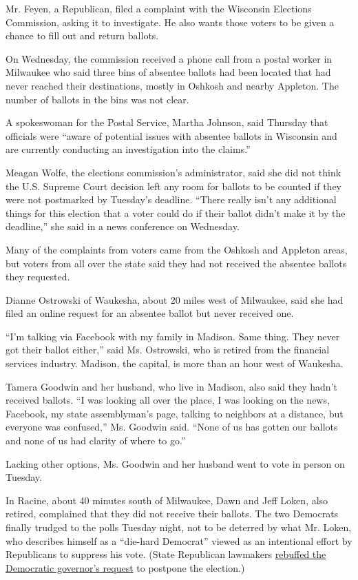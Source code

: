 Mr. Feyen, a Republican, filed a complaint with the Wisconsin Elections
Commission, asking it to investigate. He also wants those voters to be
given a chance to fill out and return ballots.

On Wednesday, the commission received a phone call from a postal worker
in Milwaukee who said three bins of absentee ballots had been located
that had never reached their destinations, mostly in Oshkosh and nearby
Appleton. The number of ballots in the bins was not clear.

A spokeswoman for the Postal Service, Martha Johnson, said Thursday that
officials were ``aware of potential issues with absentee ballots in
Wisconsin and are currently conducting an investigation into the
claims.''

Meagan Wolfe, the elections commission's administrator, said she did not
think the U.S. Supreme Court decision left any room for ballots to be
counted if they were not postmarked by Tuesday's deadline. ``There
really isn't any additional things for this election that a voter could
do if their ballot didn't make it by the deadline,'' she said in a news
conference on Wednesday.

Many of the complaints from voters came from the Oshkosh and Appleton
areas, but voters from all over the state said they had not received the
absentee ballots they requested.

Dianne Ostrowski of Waukesha, about 20 miles west of Milwaukee, said she
had filed an online request for an absentee ballot but never received
one.

``I'm talking via Facebook with my family in Madison. Same thing. They
never got their ballot either,'' said Ms. Ostrowski, who is retired from
the financial services industry. Madison, the capital, is more than an
hour west of Waukesha.

Tamera Goodwin and her husband, who live in Madison, also said they
hadn't received ballots. ``I was looking all over the place, I was
looking on the news, Facebook, my state assemblyman's page, talking to
neighbors at a distance, but everyone was confused,'' Ms. Goodwin said.
``None of us has gotten our ballots and none of us had clarity of where
to go.''

Lacking other options, Ms. Goodwin and her husband went to vote in
person on Tuesday.

In Racine, about 40 minutes south of Milwaukee, Dawn and Jeff Loken,
also retired, complained that they did not receive their ballots. The
two Democrats finally trudged to the polls Tuesday night, not to be
deterred by what Mr. Loken, who describes himself as a ``die-hard
Democrat'' viewed as an intentional effort by Republicans to suppress
his vote. (State Republican lawmakers
\href{https://www.nytimes.com/2020/04/06/us/politics/wisconsin-primary-voting-coronavirus.html}{rebuffed
the Democratic governor's request} to postpone the election.)

